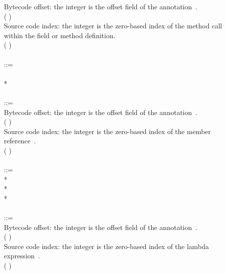 \documentclass{article}
\begin{document}
\begin{tabbing}
\qquad    \bnfcmt Bytecode offset: the integer is the offset field of the annotation~\cite{JSR308-webpage-201310}. \\
\qquad    (\bnflit{\#} ) \\
\qquad    \bnfcmt Source code index: the integer is the zero-based index of the method call \\
\qquad    \bnfcmt within the field or method definition. \\
\qquad    \bnfor{} (\bnflit{*} ) \\
\\
 ::= \\
\qquad    {}  \bnflit{:} \lineend \\
\qquad    {}* \\
\\
 ::= \\
\qquad    \bnfcmt Bytecode offset: the integer is the offset field of the annotation~\cite{JSR308-webpage-201310}. \\
\qquad    (\bnflit{\#} ) \\
\qquad    \bnfcmt Source code index: the integer is the zero-based index of the member \\
\qquad    \bnfcmt reference~\cite{JSR308-webpage-201310}. \\
\qquad    \bnfor{} (\bnflit{*} ) \\
\\
 ::= \\
\qquad    {}  \bnflit{:} * \lineend \\
\qquad    {}* \\
\qquad    {}* \\
\\
 ::= \\
\qquad    \bnfcmt Bytecode offset: the integer is the offset field of the annotation~\cite{JSR308-webpage-201310}. \\
\qquad    (\bnflit{\#} ) \\
\qquad    \bnfcmt Source code index: the integer is the zero-based index of the lambda \\
\qquad    \bnfcmt expression~\cite{JSR308-webpage-201310}. \\
\qquad    \bnfor{} (\bnflit{*} ) \\

\end{tabbing}
\end{document}
